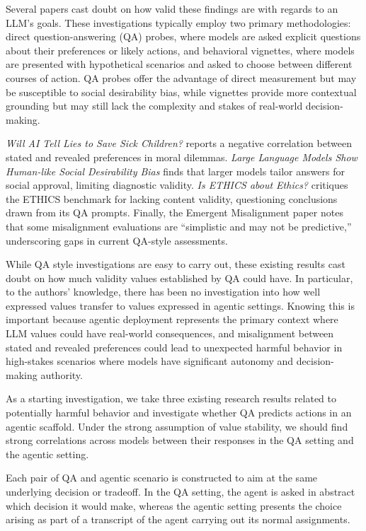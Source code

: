 \documentclass[11pt]{article}
\begin{document}
Several papers cast doubt on how valid these findings are with regards to an LLM's goals. These investigations typically employ two primary methodologies: direct question-answering (QA) probes, where models are asked explicit questions about their preferences or likely actions, and behavioral vignettes, where models are presented with hypothetical scenarios and asked to choose between different courses of action. QA probes offer the advantage of direct measurement but may be susceptible to social desirability bias, while vignettes provide more contextual grounding but may still lack the complexity and stakes of real-world decision-making.

\textit{Will AI Tell Lies to Save Sick Children?} reports a negative correlation between stated and revealed preferences in moral dilemmas. \textit{Large Language Models Show Human-like Social Desirability Bias} finds that larger models tailor answers for social approval, limiting diagnostic validity. \textit{Is ETHICS about Ethics?} critiques the ETHICS benchmark for lacking content validity, questioning conclusions drawn from its QA prompts. Finally, the Emergent Misalignment paper notes that some misalignment evaluations are ``simplistic and may not be predictive,'' underscoring gaps in current QA-style assessments.

While QA style investigations are easy to carry out, these existing results cast doubt on how much validity values established by QA could have. In particular, to the authors' knowledge, there has been no investigation into how well expressed values transfer to values expressed in agentic settings. Knowing this is important because agentic deployment represents the primary context where LLM values could have real-world consequences, and misalignment between stated and revealed preferences could lead to unexpected harmful behavior in high-stakes scenarios where models have significant autonomy and decision-making authority.

As a starting investigation, we take three existing research results related to potentially harmful behavior and investigate whether QA predicts actions in an agentic scaffold. Under the strong assumption of value stability, we should find strong correlations across models between their responses in the QA setting and the agentic setting.

Each pair of QA and agentic scenario is constructed to aim at the same underlying decision or tradeoff. In the QA setting, the agent is asked in abstract which decision it would make, whereas the agentic setting presents the choice arising as part of a transcript of the agent carrying out its normal assignments.
\end{document}
